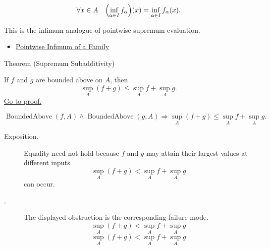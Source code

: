 \begin{remark*}
\[
  \forall x\in A\quad
  \Bigl(\inf_{\alpha\in I}f_\alpha\Bigr)(x)
  =
  \inf_{\alpha\in I}f_\alpha(x).
\]
\end{remark*}

\begin{remark*}[Interpretation]
This is the infimum analogue of pointwise supremum evaluation.
\end{remark*}

\begin{dependencies}
\begin{itemize}
  \item \hyperref[def:pointwise-infimum-family]{Pointwise Infimum of a Family}
\end{itemize}
\end{dependencies}

\begin{theorembox}{Theorem (Supremum Subadditivity)}
\begin{theorem}
\label{thm:supremum-subadditivity}
If \(f\) and \(g\) are bounded above on \(A\), then
\[
  \sup_A(f+g)\leq \sup_A f+\sup_A g.
\]
\hyperref[prf:supremum-subadditivity]{Go to proof.}
\end{theorem}
\end{theorembox}

\begin{remark*}
\[
  \operatorname{BoundedAbove}(f,A)\wedge\operatorname{BoundedAbove}(g,A)
  \Rightarrow
  \sup_A(f+g)\leq \sup_A f+\sup_A g.
\]
\end{remark*}

\begin{remark*}
\begin{description}
  \item[Exposition.]
Equality need not hold because \(f\) and \(g\) may attain their largest values
at different inputs.
\[
  \sup_A(f+g)<\sup_A f+\sup_A g
\]
can occur.


  \item[\exists{}.]
  The displayed obstruction is the corresponding failure mode.
  \[
  \sup_A(f+g)<\sup_A f+\sup_A g
\]
  \[
  \sup_A(f+g)<\sup_A f+\sup_A g
\]
\end{description}
\end{remark*}

